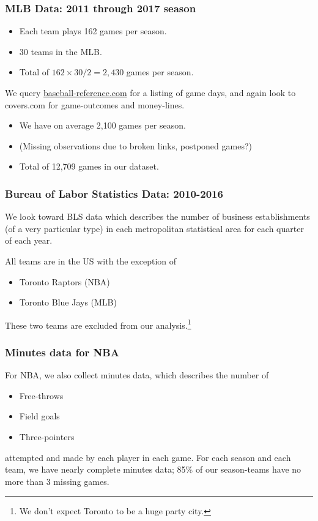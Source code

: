 \documentclass{beamer}
\begin{document}
\begin{frame}   \frametitle{MLB Data: 2011 through 2017 season}
  \begin{itemize}     \item Each team plays 162 games per season.
    \item 30 teams in the MLB.
    \item Total of $162 \times 30 / 2 = 2,430$ games per season.   \end{itemize}
  
  \vspace{12pt}We query \href{http://www.baseball-reference.com/leagues/}{baseball-reference.com}
  for a listing of game days, and again look to covers.com for game-outcomes and money-lines.
  
  \vspace{12pt}
  \begin{itemize}     \item We have on average 2,100 games per season.
    \item (Missing observations due to broken links, postponed games?)
    \item Total of 12,709 games in our dataset.    \end{itemize} \end{frame}

\begin{frame}   \frametitle{Bureau of Labor Statistics Data: 2010-2016}
  We look toward BLS data which describes the number of business establishments 
  (of a very particular type) in each metropolitan statistical area
  for each quarter of each year.
  
  \vspace{12pt}  All teams are in the US with the exception of 
  \vspace{12pt}\begin{itemize}     \item Toronto Raptors (NBA)
    \item Toronto Blue Jays (MLB)   \end{itemize} 

  \vspace{12pt}These two teams are excluded from our analysis.\footnote{We don't expect Toronto to be a huge party city.} \end{frame}

\begin{frame}   \frametitle{Minutes data for NBA}
  For NBA, we also collect minutes data, which describes the number of 
  \vspace{12pt}
  \begin{itemize}     
    \item Free-throws
    \item Field goals
    \item Three-pointers   
  \end{itemize}
  \vspace{12pt}attempted and made by each player in each game. For each season and each team,
  we have nearly complete minutes data; 85\% of our season-teams have no more than 3 missing games. \end{frame}
\end{document}
